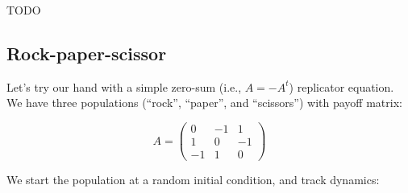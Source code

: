 \documentclass[]{book}
\begin{document}
TODO

\hypertarget{rock-paper-scissor}{%
\subsection{Rock-paper-scissor}\label{rock-paper-scissor}}

Let's try our hand with a simple zero-sum (i.e., \(A = -A^t\)) replicator equation. We have three populations (``rock'', ``paper'', and ``scissors'') with payoff matrix:

\[
A = \begin{pmatrix}
0 & -1 & 1\\
1 & 0 & -1\\
-1 & 1 & 0
\end{pmatrix}
\]

We start the population at a random initial condition, and track dynamics:
\end{document}
